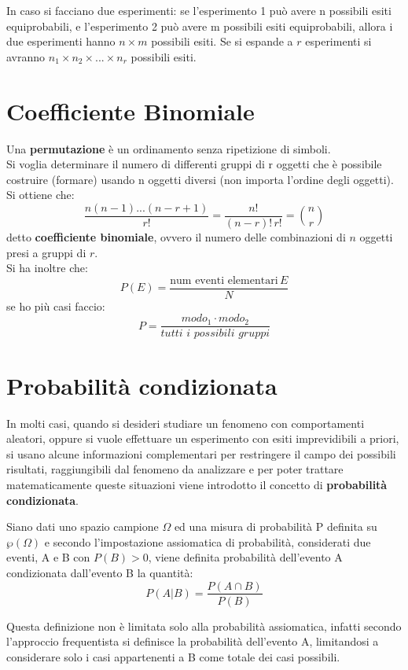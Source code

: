 \documentclass[a4paper,12pt, oneside]{book}
\begin{document}
In caso si facciano due esperimenti: se l'esperimento 1 può avere n possibili esiti equiprobabili,
e l'esperimento 2 può avere m possibili esiti equiprobabili, allora i due esperimenti hanno $n\times m$ possibili esiti.
Se si espande a $r$ esperimenti si avranno $n_1\times n_2\times ...\times n_r$ possibili esiti.
\section{Coefficiente Binomiale}
Una \textbf{permutazione} è un ordinamento senza ripetizione di simboli.\\
Si voglia determinare il numero di differenti gruppi di r oggetti che è possibile costruire
(formare) usando n oggetti diversi (non importa l’ordine degli oggetti). Si ottiene che:
\[\frac{n(n-1)...(n-r+1)}{r!}=\frac{n!}{(n-r)!\,r!}= {n\choose r}\]
detto \textbf{coefficiente binomiale}, ovvero il numero delle combinazioni di $n$ oggetti presi a gruppi di $r$.\\
Si ha inoltre che:
\[P(E)=\frac{\mbox{num eventi elementari} \, E}{N}\]
se ho più casi faccio:
\[P=\frac{modo_1\cdot modo_2}{tutti\,\, i\,\, possibili\,\, gruppi}\]

\section{Probabilità condizionata}
In molti casi, quando si desideri studiare un fenomeno con comportamenti aleatori, oppure si vuole effettuare
un esperimento con esiti imprevidibili a priori, si usano alcune informazioni complementari per restringere 
il campo dei possibili risultati, raggiungibili dal fenomeno da analizzare e per poter trattare matematicamente
queste situazioni viene introdotto il concetto di \textbf{probabilità condizionata}.

\begin{definizione}
Siano dati uno spazio campione $\Omega$ ed una misura di probabilità P definita su $\wp(\Omega)$ e
secondo l’impostazione assiomatica di probabilità, considerati due eventi, A e B con $P(B)>0$,
viene definita  probabilità dell'evento A condizionata dall'evento B la quantità:
\[P(A|B) = \frac{P(A\cap B)}{P(B)} \]
\end{definizione}
Questa definizione non è limitata solo alla probabilità assiomatica, infatti secondo l'approccio frequentista 
si definisce la probabilità dell'evento A, limitandosi a considerare solo i casi appartenenti a B come totale dei casi possibili.
\end{document}
